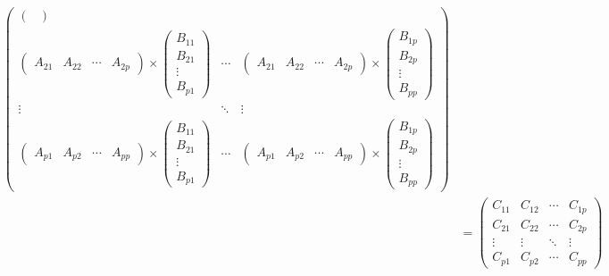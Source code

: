 \documentclass[11pt]{article}
\begin{document}
\begin{equation}
\begin{split}
\begin{pmatrix}
\begin{pmatrix}
        \end{pmatrix} \\
        \begin{pmatrix}
            A_{21} & A_{22} & \cdots & A_{2p}
        \end{pmatrix} \times \begin{pmatrix}
            B_{11} \\ B_{21} \\ \vdots \\ B_{p1}
        \end{pmatrix} & \cdots & \begin{pmatrix}
            A_{21} & A_{22} & \cdots & A_{2p}
        \end{pmatrix} \times \begin{pmatrix}
            B_{1p} \\ B_{2p} \\ \vdots \\ B_{pp}
        \end{pmatrix} \\
        \vdots & \ddots & \vdots \\
        \begin{pmatrix}
            A_{p1} & A_{p2} & \cdots & A_{pp}
        \end{pmatrix} \times \begin{pmatrix}
            B_{11} \\ B_{21} \\ \vdots \\ B_{p1}
        \end{pmatrix} & \cdots & \begin{pmatrix}
            A_{p1} & A_{p2} & \cdots & A_{pp}
        \end{pmatrix} \times \begin{pmatrix}
            B_{1p} \\ B_{2p} \\ \vdots \\ B_{pp}
            \end{pmatrix}
    \end{pmatrix}\\
    &= \begin{pmatrix}
        C_{11} & C_{12} & \cdots & C_{1p} \\
        C_{21} & C_{22} & \cdots & C_{2p} \\
        \vdots & \vdots & \ddots & \vdots \\
        C_{p1} & C_{p2} & \cdots & C_{pp}
    \end{pmatrix}
    \end{split}
\end{equation}
\end{document}
